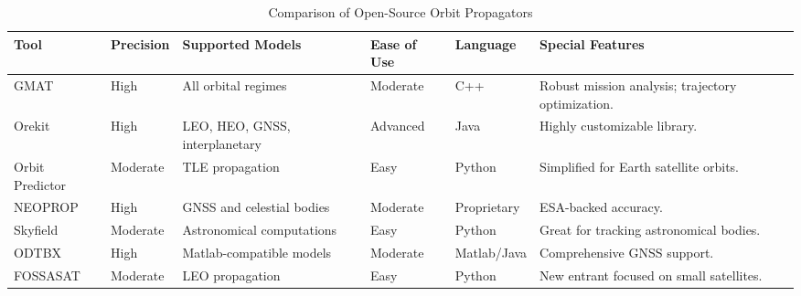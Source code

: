 % 

\begin{sidewaystable}[!htbp]
\centering
\begin{tabular}{lllllp{5cm}}
\hline
\textbf{Tool}            & \textbf{Precision} & \textbf{Supported Models}      & \textbf{Ease of Use} & \textbf{Language}   & \textbf{Special Features} \\
\hline
GMAT                    & High               & All orbital regimes            & Moderate             & C++                 & Robust mission analysis; trajectory optimization. \\
Orekit                  & High               & LEO, HEO, GNSS, interplanetary & Advanced             & Java                & Highly customizable library. \\
Orbit Predictor         & Moderate           & TLE propagation                & Easy                 & Python              & Simplified for Earth satellite orbits. \\
NEOPROP                 & High               & GNSS and celestial bodies      & Moderate             & Proprietary         & ESA-backed accuracy. \\
Skyfield                & Moderate           & Astronomical computations      & Easy                 & Python              & Great for tracking astronomical bodies. \\
ODTBX                   & High               & Matlab-compatible models       & Moderate             & Matlab/Java         & Comprehensive GNSS support. \\
FOSSASAT                & Moderate           & LEO propagation                & Easy                 & Python              & New entrant focused on small satellites. \\
\hline
\end{tabular}
\caption{Comparison of Open-Source Orbit Propagators}
\label{tab:propagator_comparison}
\end{sidewaystable}

\endinput  %
